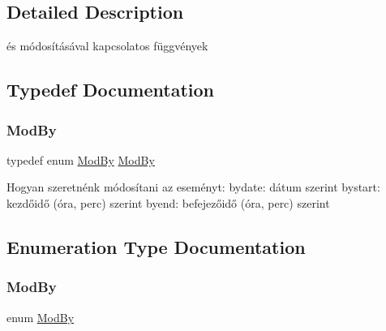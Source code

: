 \subsection{Detailed Description}
és módosításával kapcsolatos függvények 

\subsection{Typedef Documentation}
\mbox{\label{group___esem_xC3_xA9nyek_ga362ee478a7a01737cf42d32360eda02e}} 
\subsubsection{\texorpdfstring{Mod\+By}{ModBy}}
{\footnotesize\ttfamily typedef enum \hyperlink{group___esem_xC3_xA9nyek_ga643f8b09cbc45afc4ad36b27c077b1fd}{Mod\+By} \hyperlink{group___esem_xC3_xA9nyek_ga643f8b09cbc45afc4ad36b27c077b1fd}{Mod\+By}}

Hogyan szeretnénk módosítani az eseményt\+: bydate\+: dátum szerint bystart\+: kezdőidő (óra, perc) szerint byend\+: befejezőidő (óra, perc) szerint 

\subsection{Enumeration Type Documentation}
\mbox{\label{group___esem_xC3_xA9nyek_ga643f8b09cbc45afc4ad36b27c077b1fd}} 
\subsubsection{\texorpdfstring{Mod\+By}{ModBy}}
{\footnotesize\ttfamily enum \hyperlink{group___esem_xC3_xA9nyek_ga643f8b09cbc45afc4ad36b27c077b1fd}{Mod\+By}}

